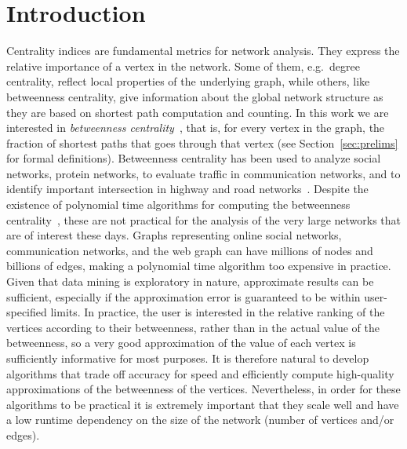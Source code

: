 \section{Introduction}\label{sec:intro}
Centrality indices are fundamental metrics for network analysis. They express the
relative importance of a vertex in the network. Some of them, e.g.~degree
centrality, reflect local properties of the underlying graph, while others,
like betweenness centrality, give information about the global network structure
as they are based on shortest path computation and counting\citep{Newman05}. In
this work we are interested in \emph{betweenness
centrality}~\citep{Anthonisse71,Freeman77}, that is, for every vertex in the
graph, the fraction of shortest paths that goes through that vertex (see
Section~\ref{sec:prelims} for formal definitions). Betweenness centrality has
been used to analyze social networks, protein networks, to evaluate traffic in
communication networks, and to identify important intersection in highway and
road networks~\citep{Newman05,GeisbergerSS08}. Despite the existence of
polynomial time algorithms for computing the betweenness
centrality~\citep{Brandes01}, these are not practical for the analysis of the
very large networks that are of interest these days. Graphs representing online
social networks, communication networks, and the web graph can have millions of
nodes and billions of edges, making a polynomial time algorithm too expensive in
practice. Given that data mining is exploratory in nature, approximate results
can be sufficient, especially if the approximation error is guaranteed to be
within user-specified limits. In practice, the user is interested in the
relative ranking of the vertices according to their betweenness, rather than in
the actual value of the betweenness, so a very good approximation of the value
of each vertex is sufficiently informative for most purposes. It is therefore
natural to develop algorithms that trade off accuracy for speed and efficiently 
compute high-quality approximations of the betweenness of the vertices.
Nevertheless, in order for these algorithms to be practical it is extremely
important that they scale well and have a low runtime dependency on the size of
the network (number of vertices and/or edges).

